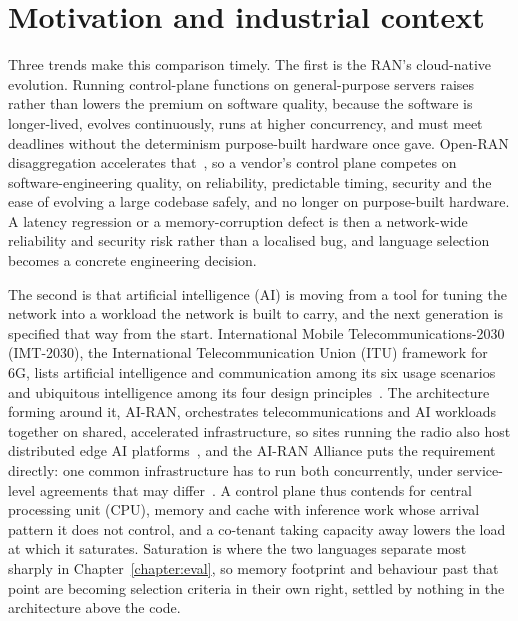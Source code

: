 \section{Motivation and industrial context}\label{sec:motivation}
Three trends make this comparison timely. The first is the RAN's cloud-native evolution. Running
control-plane functions on general-purpose servers raises rather than lowers the premium on
software quality, because the software is longer-lived, evolves continuously, runs at higher
concurrency, and must meet deadlines without the determinism purpose-built hardware once gave.
Open-RAN disaggregation accelerates that~\cite{polese2023oran}, so a vendor's control plane
competes on software-engineering quality, on reliability, predictable timing, security and the
ease of evolving a large codebase safely, and no longer on purpose-built hardware. A latency
regression or a memory-corruption defect is then a network-wide reliability and security risk
rather than a localised bug, and language selection becomes a concrete engineering decision.

The second is that artificial intelligence (AI) is moving from a tool for tuning the network into
a workload the network is built to carry, and the next generation is specified that way from the
start. International Mobile Telecommunications-2030 (IMT-2030), the International
Telecommunication Union (ITU) framework for 6G, lists artificial intelligence and communication
among its six usage scenarios and ubiquitous intelligence among its four design
principles~\cite{itu2023imt2030}. The architecture forming around it, AI-RAN, orchestrates
telecommunications and AI workloads together on shared, accelerated infrastructure, so sites
running the radio also host distributed edge AI platforms~\cite{polese2026airan}, and the AI-RAN
Alliance puts the requirement directly: one common infrastructure has to run both concurrently,
under service-level agreements that may differ~\cite{airan2026orchestrator}. A control plane thus
contends for central processing unit (CPU), memory and cache with inference work whose arrival
pattern it does not control, and a co-tenant taking capacity away lowers the load at which it
saturates. Saturation is where the two languages separate most sharply in
Chapter~\ref{chapter:eval}, so memory footprint and behaviour past that point are becoming
selection criteria in their own right, settled by nothing in the architecture above the code.

